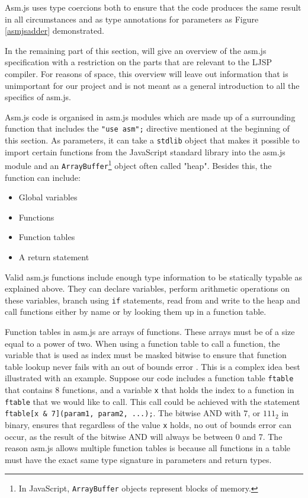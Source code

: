 \documentclass[11pt]{report}
\begin{document}
Asm.js uses type coercions both to ensure that the code produces the same result in all circumstances and as type annotations for parameters as Figure \ref{asmjsadder} demonstrated.

In the remaining part of this section, will give an overview of the asm.js specification with a restriction on the parts that are relevant to the LJSP compiler. For reasons of space, this overview will leave out information that is unimportant for our project and is not meant as a general introduction to all the specifics of asm.js.

Asm.js code is organised in asm.js modules which are made up of a surrounding function that includes the \texttt{"use asm";} directive mentioned at the beginning of this section. As parameters, it can take a \texttt{stdlib} object that makes it possible to import certain functions from the JavaScript standard library into the asm.js module and an \texttt{ArrayBuffer}\footnote{In JavaScript, \texttt{ArrayBuffer} objects represent blocks of memory.} object often called "heap". Besides this, the function can include:
\begin{itemize}
\item Global variables
\item Functions
\item Function tables
\item A return statement
\end{itemize}

Valid asm.js functions include enough type information to be statically typable as explained above. They can declare variables, perform arithmetic operations on these variables, branch using \texttt{if} statements, read from and write to the heap and call functions either by name or by looking them up in a function table.

Function tables in asm.js are arrays of functions. These arrays must be of a size equal to a power of two. When using a function table to call a function, the variable that is used as index must be masked bitwise to ensure that function table lookup never fails with an out of bounds error \cite{asmjspdf}. This is a complex idea best illustrated with an example. Suppose our code includes a function table \texttt{ftable} that contains $8$ functions, and a variable \texttt{x} that holds the index to a function in \texttt{ftable} that we would like to call. This call could be achieved with the statement \texttt{ftable[x \& 7](param1, param2, ...);}. The bitwise AND with $7$, or $111_2$ in binary, ensures that regardless of the value \texttt{x} holds, no out of bounds error can occur, as the result of the bitwise AND will always be between 0 and 7. The reason asm.js allows multiple function tables is because all functions in a table must have the exact same type signature in parameters and return types.
\end{document}
